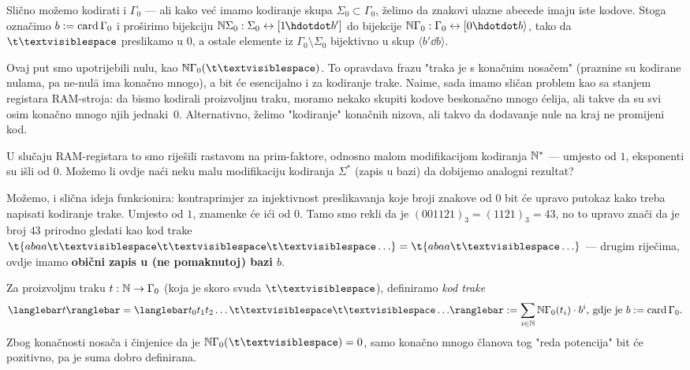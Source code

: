 Slično možemo kodirati i $\Gamma_0$ --- ali kako već imamo kodiranje skupa $\Sigma_0\subset\Gamma_0$, želimo da znakovi ulazne abecede imaju iste kodove. Stoga označimo $b:=\operatorname{card}\Gamma_0$ i proširimo bijekciju $\N\Sigma_0:\Sigma_0\leftrightarrow[1\mspace{-1mu}\dd b']$ do bijekcije $\N\Gamma_0:\Gamma_0\leftrightarrow[0\dd b\rangle$, tako da $\bl$ preslikamo u $0$, a ostale elemente iz $\Gamma_0\!\setminus\Sigma_0$ bijektivno u skup $\langle b'\dd b\rangle$.

Ovaj put smo upotrijebili nulu, kao $\N\Gamma_0(\bl)$. To opravdava frazu "traka je s konačnim nosačem" (praznine su kodirane nulama, pa ne-nul\=a ima konačno mnogo), a bit će esencijalno i za kodiranje trake. Naime, sada imamo sličan problem kao sa stanjem registara RAM-stroja: da bismo kodirali proizvoljnu traku, moramo nekako skupiti kodove beskonačno mnogo ćelija, ali takve da su svi osim konačno mnogo njih jednaki~$0$. Alternativno, želimo "kodiranje" konačnih nizova, ali takvo da dodavanje nule na kraj ne promijeni kod.

U slučaju RAM-registara to smo riješili rastavom na prim-faktore, odnosno malom modifikacijom kodiranja ${\mathbb N}^*$ --- umjesto od $1$, eksponenti su išli od $0$. Možemo li ovdje naći neku malu modifikaciju kodiranja $\Sigma^*$ (zapis u bazi) da dobijemo analogni rezultat?

Možemo, i slična ideja funkcionira: kontraprimjer za injektivnost preslikavanja koje broji znakove od $0$ bit će upravo putokaz kako treba napisati kodiranje trake. Umjesto od $1$, znamenke će ići od $0$. Tamo smo rekli da je $(001121)_3=(1121)_3=43$, no to upravo znači da je broj $43$ prirodno gledati kao kod trake $\t{abaa\bl\bl\bl\ldots}=\t{abaa\bl\ldots}$ --- drugim riječima, ovdje imamo \textbf{obični zapis u (ne pomaknutoj$\mspace{1mu}$) bazi $b$}.

\begin{definicija}[{name=[kodiranje trake Turingova stroja]}]
Za proizvoljnu traku $t:{\mathbb N}\to\Gamma_0$ (koja je skoro svuda $\bl$), definiramo \emph{kod trake} \begin{equation}
	\knk{t}=\knk{t_0t_1t_2\ldots\bl\bl\ldots}:=\sum_{i\in\N}\N\Gamma_0(t_i)\cdot b^i\text{, gdje je $b:=\card\Gamma_0$.}
\end{equation}
	Zbog konačnosti nosača i činjenice da je $\N\Gamma_0(\mspace{0.5mu}\bl)=0$, samo konačno mnogo članova tog "reda potencija" bit će pozitivno, pa je suma dobro definirana.
\end{definicija}

